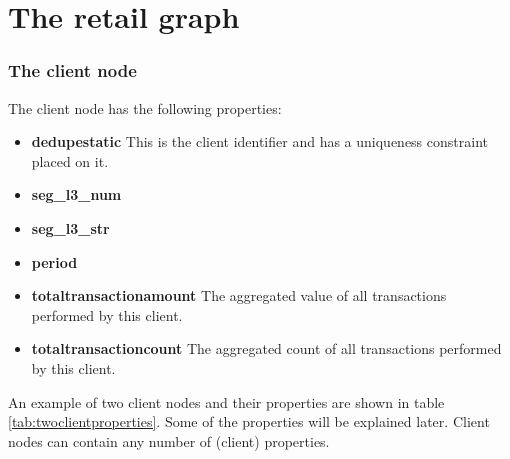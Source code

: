 \section{The retail graph}


\subsubsection{The client node}
The client node has the following properties:
\begin{itemize}
  \item \textbf{dedupestatic}  This is the client identifier and has a uniqueness  constraint placed on it.
  \item \textbf{seg\_l3\_num}
   \item \textbf{seg\_l3\_str}
   \item \textbf{period}   
  \item \textbf{totaltransactionamount} The aggregated value of all transactions performed by this client.
  \item \textbf{totaltransactioncount} The aggregated count of all transactions performed by this client.
\end{itemize}

 An example of two client nodes and their properties are shown in table \ref{tab:twoclientproperties}.  Some of the properties will be explained later.  Client nodes can contain any number of (client) properties.

